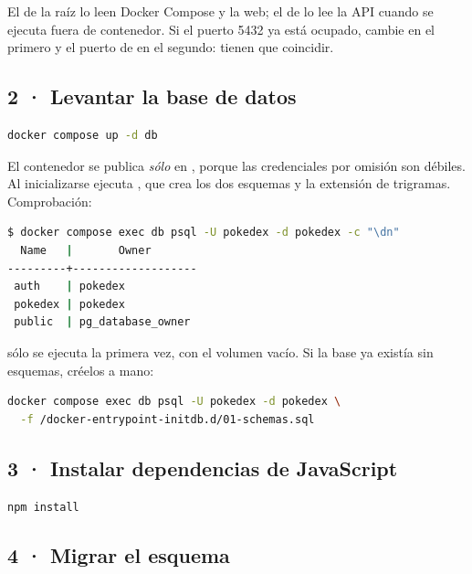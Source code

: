 El  de la raíz lo leen Docker Compose y la web; el de
 lo lee la API cuando se ejecuta fuera de contenedor. Si el
puerto 5432 ya está ocupado, cambie  en el primero y el
puerto de  en el segundo: tienen que coincidir.

\subsection{2 · Levantar la base de datos}

\begin{lstlisting}[language=bash]
docker compose up -d db
\end{lstlisting}

El contenedor se publica \emph{sólo} en , porque las
credenciales por omisión son débiles. Al inicializarse ejecuta
, que crea los dos esquemas y la extensión de
trigramas. Comprobación:

\begin{lstlisting}[language=bash]
$ docker compose exec db psql -U pokedex -d pokedex -c "\dn"
  Name   |       Owner
---------+-------------------
 auth    | pokedex
 pokedex | pokedex
 public  | pg_database_owner
\end{lstlisting}

\begin{pkwarn}
 sólo se ejecuta la primera vez, con el volumen vacío. Si la
base ya existía sin esquemas, créelos a mano:
\begin{lstlisting}[language=bash,xleftmargin=0pt,framerule=0pt,backgroundcolor=\color{white}]
docker compose exec db psql -U pokedex -d pokedex \
  -f /docker-entrypoint-initdb.d/01-schemas.sql
\end{lstlisting}
\end{pkwarn}

\subsection{3 · Instalar dependencias de JavaScript}

\begin{lstlisting}[language=bash]
npm install
\end{lstlisting}

\subsection{4 · Migrar el esquema }

